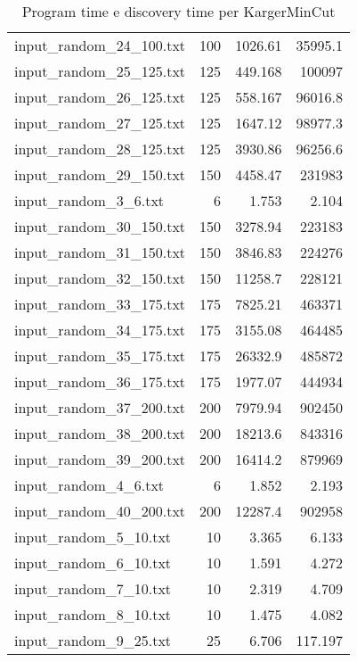 \begin{table}[H]
\begin{tabular}{lrrr}
     input\_random\_24\_100.txt &     100 &         1026.61  &      35995.1   \\
     input\_random\_25\_125.txt &     125 &          449.168 &     100097     \\
     input\_random\_26\_125.txt &     125 &          558.167 &      96016.8   \\
     input\_random\_27\_125.txt &     125 &         1647.12  &      98977.3   \\
     input\_random\_28\_125.txt &     125 &         3930.86  &      96256.6   \\
     input\_random\_29\_150.txt &     150 &         4458.47  &     231983     \\
     input\_random\_3\_6.txt    &       6 &            1.753 &          2.104 \\
     input\_random\_30\_150.txt &     150 &         3278.94  &     223183     \\
     input\_random\_31\_150.txt &     150 &         3846.83  &     224276     \\
     input\_random\_32\_150.txt &     150 &        11258.7   &     228121     \\
     input\_random\_33\_175.txt &     175 &         7825.21  &     463371     \\
     input\_random\_34\_175.txt &     175 &         3155.08  &     464485     \\
     input\_random\_35\_175.txt &     175 &        26332.9   &     485872     \\
     input\_random\_36\_175.txt &     175 &         1977.07  &     444934     \\
     input\_random\_37\_200.txt &     200 &         7979.94  &     902450     \\
     input\_random\_38\_200.txt &     200 &        18213.6   &     843316     \\
     input\_random\_39\_200.txt &     200 &        16414.2   &     879969     \\
     input\_random\_4\_6.txt    &       6 &            1.852 &          2.193 \\
     input\_random\_40\_200.txt &     200 &        12287.4   &     902958     \\
     input\_random\_5\_10.txt   &      10 &            3.365 &          6.133 \\
     input\_random\_6\_10.txt   &      10 &            1.591 &          4.272 \\
     input\_random\_7\_10.txt   &      10 &            2.319 &          4.709 \\
     input\_random\_8\_10.txt   &      10 &            1.475 &          4.082 \\
     input\_random\_9\_25.txt   &      25 &            6.706 &        117.197 \\
     \hline
    \end{tabular}

    \caption{Program time e discovery time per KargerMinCut}
    \label{table:karger-running-time}
\end{table}

